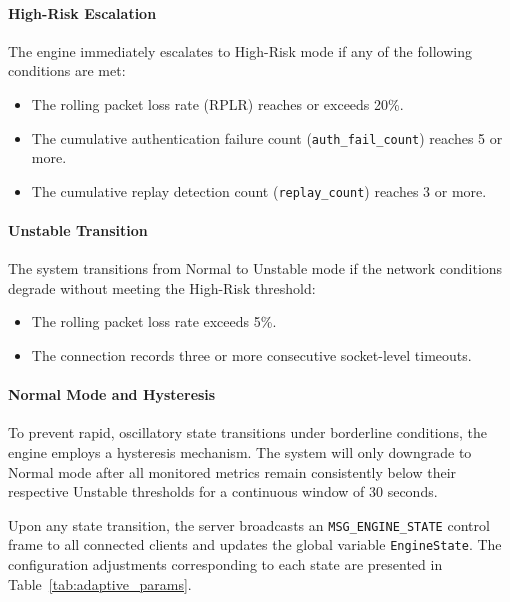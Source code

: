\documentclass[conference]{IEEEtran}
\begin{document}
\paragraph{High-Risk Escalation}
The engine immediately escalates to High-Risk mode if any of the following conditions are met:
\begin{itemize}
    \item The rolling packet loss rate (RPLR) reaches or exceeds 20\%.
    \item The cumulative authentication failure count (\texttt{auth\_fail\_count}) reaches 5 or more.
    \item The cumulative replay detection count (\texttt{replay\_count}) reaches 3 or more.
\end{itemize}

\paragraph{Unstable Transition}
The system transitions from Normal to Unstable mode if the network conditions degrade without meeting the High-Risk threshold:
\begin{itemize}
    \item The rolling packet loss rate exceeds 5\%.
    \item The connection records three or more consecutive socket-level timeouts.
\end{itemize}

\paragraph{Normal Mode and Hysteresis}
To prevent rapid, oscillatory state transitions under borderline conditions, the engine employs a hysteresis mechanism. The system will only downgrade to Normal mode after all monitored metrics remain consistently below their respective Unstable thresholds for a continuous window of 30 seconds.

Upon any state transition, the server broadcasts an \texttt{MSG\_ENGINE\_STATE} control frame to all connected clients and updates the global variable \texttt{EngineState}. The configuration adjustments corresponding to each state are presented in Table~\ref{tab:adaptive_params}.
\end{document}
